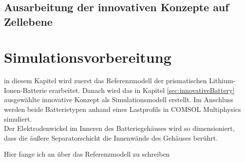 \subsection{Ausarbeitung der innovativen Konzepte auf Zellebene}\label{sub:ausarbeitungKonzept}




\newpage
\section{Simulationsvorbereitung}\label{sec:SimulationPREP}

in diesem Kapitel wird zuerst das Referenzmodell der prismatischen Lithium-Ionen-Batterie erarbeitet. Danach wird das in Kapitel \ref{sec:innovativeBattery} ausgewählte innovative Konzept als Simulationsmodell erstellt. Im Anschluss werden beide Batterietypen anhand eines Lastprofils in COMSOL Multiphysics\textsuperscript{\textregistered} simuliert.\\



Der Elektrodenwickel im Inneren des Batteriegehäuses wird so dimensioniert, dass die äußere Separatorschicht die Innenwände des Gehäuses berührt.

Hier fange ich an über das Referenzmodell zu schreiben


	